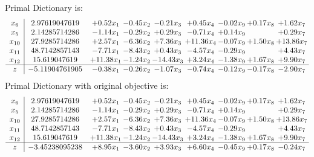 \documentclass[8pt]{article}
\begin{document}
Primal Dictionary is:
\[\begin{array}{c| c c@{\hskip 2pt} c@{\hskip 2pt} c@{\hskip 2pt} c@{\hskip 2pt} c@{\hskip 2pt} c@{\hskip 2pt} c@{\hskip 2pt} }
 x_{6}   &  2.97619047619 & +  0.52 x_{1} & -0.45 x_{2} & -0.21 x_{3} & +  0.45 x_{4} & -0.02 x_{9} & +  0.17 x_{8} & +  1.62 x_{7}\\
 x_{5}   &  2.14285714286 & -1.14 x_{1} & -0.29 x_{2} & +  0.29 x_{3} & -0.71 x_{4} & +  0.14 x_{9} &   & +  0.29 x_{7}\\
 x_{10}   &  27.9285714286 & +  2.57 x_{1} & -6.36 x_{2} & +  7.36 x_{3} & + 11.36 x_{4} & -0.07 x_{9} & +  1.50 x_{8} & + 13.86 x_{7}\\
 x_{11}   &  48.7142857143 & -7.71 x_{1} & -8.43 x_{2} & +  0.43 x_{3} & -4.57 x_{4} & -0.29 x_{9} &   & +  4.43 x_{7}\\
 x_{12}   &  15.619047619 & + 11.38 x_{1} & -1.24 x_{2} & -14.43 x_{3} & +  3.24 x_{4} & -1.38 x_{9} & +  1.67 x_{8} & +  9.90 x_{7}\\
\hline
z    &  -5.11904761905 & -0.38 x_{1} & -0.26 x_{2} & -1.07 x_{3} & -0.74 x_{4} & -0.12 x_{9} & -0.17 x_{8} & -2.90 x_{7}\\
\end{array}\]
Primal Dictionary with original objective is:
\[\begin{array}{c| c c@{\hskip 2pt} c@{\hskip 2pt} c@{\hskip 2pt} c@{\hskip 2pt} c@{\hskip 2pt} c@{\hskip 2pt} c@{\hskip 2pt} }
 x_{6}   &  2.97619047619 & +  0.52 x_{1} & -0.45 x_{2} & -0.21 x_{3} & +  0.45 x_{4} & -0.02 x_{9} & +  0.17 x_{8} & +  1.62 x_{7}\\
 x_{5}   &  2.14285714286 & -1.14 x_{1} & -0.29 x_{2} & +  0.29 x_{3} & -0.71 x_{4} & +  0.14 x_{9} &   & +  0.29 x_{7}\\
 x_{10}   &  27.9285714286 & +  2.57 x_{1} & -6.36 x_{2} & +  7.36 x_{3} & + 11.36 x_{4} & -0.07 x_{9} & +  1.50 x_{8} & + 13.86 x_{7}\\
 x_{11}   &  48.7142857143 & -7.71 x_{1} & -8.43 x_{2} & +  0.43 x_{3} & -4.57 x_{4} & -0.29 x_{9} &   & +  4.43 x_{7}\\
 x_{12}   &  15.619047619 & + 11.38 x_{1} & -1.24 x_{2} & -14.43 x_{3} & +  3.24 x_{4} & -1.38 x_{9} & +  1.67 x_{8} & +  9.90 x_{7}\\
\hline
z    &  -3.45238095238 & +  8.95 x_{1} & -3.60 x_{2} & +  3.93 x_{3} & +  6.60 x_{4} & -0.45 x_{9} & +  0.17 x_{8} & -0.24 x_{7}\\
\end{array}\]
\end{document}
